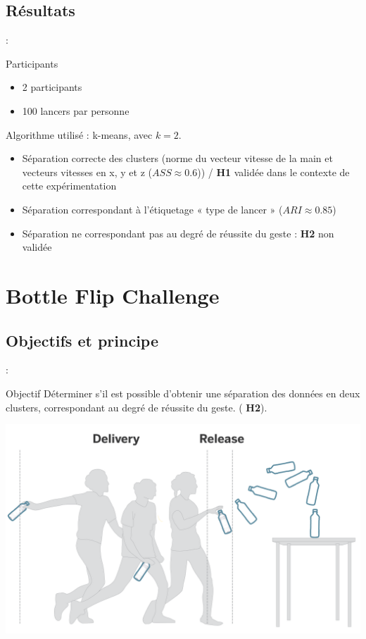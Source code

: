 \documentclass[svgnames]{beamer}
\begin{document}
	\subsection{Résultats}
	\begin{frame}{\subsecname : \subsecname}
		\begin{block}{Participants}
			\begin{itemize}[label=$\bullet$]
				\item 2 participants
				\item 100 lancers par personne
			\end{itemize}
		\end{block}
		
	Algorithme utilisé : k-means, avec $k=2$.
	\begin{itemize}
		\item Séparation correcte des clusters (norme du vecteur vitesse de la main et vecteurs vitesses en x, y et z ($ASS \approx 0.6$)) / \textbf{H1} validée dans le contexte de cette expérimentation
		\item Séparation correspondant à l'étiquetage « type de lancer » ($ARI \approx 0.85$)
		\item Séparation ne correspondant pas au degré de réussite du geste : \textbf{H2} non validée
	\end{itemize}
		
		
	\end{frame}


	\section{Bottle Flip Challenge}
	\subsection{Objectifs et principe}
	\begin{frame}{\secname : \subsecname}
		\begin{block}{Objectif}
			 Déterminer s'il est possible d'obtenir une séparation des données en deux clusters, correspondant au degré de réussite du geste. ( \textbf{H2}).
		\end{block}
	
		\centering
		\includegraphics[scale=0.2]{img/BFC_example.png}
	\end{frame}
	
\end{document}

